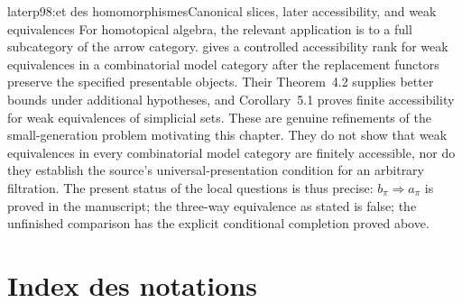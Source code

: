 \begin{dcomment}{later}{p98:et des homomorphismes}{Canonical slices, later accessibility, and weak equivalences}
For homotopical algebra, the relevant application is to a full subcategory of the arrow category. \citet[Proposition~2.2 in author version~2; Proposition~2.3 in the journal]{RaptisRosicky2015} gives a controlled accessibility rank for weak equivalences in a combinatorial model category after the replacement functors preserve the specified presentable objects. Their Theorem~4.2 supplies better bounds under additional hypotheses, and Corollary~5.1 proves finite accessibility for weak equivalences of simplicial sets. These are genuine refinements of the small-generation problem motivating this chapter. They do not show that weak equivalences in every combinatorial model category are finitely accessible, nor do they establish the source's universal-presentation condition for an arbitrary filtration. The present status of the local questions is thus precise: $b_\pi\Rightarrow a_\pi$ is proved in the manuscript; the three-way equivalence as stated is false; the unfinished comparison has the explicit conditional completion proved above.
\end{dcomment}


\newpage
{}

\section*{Index des notations}


